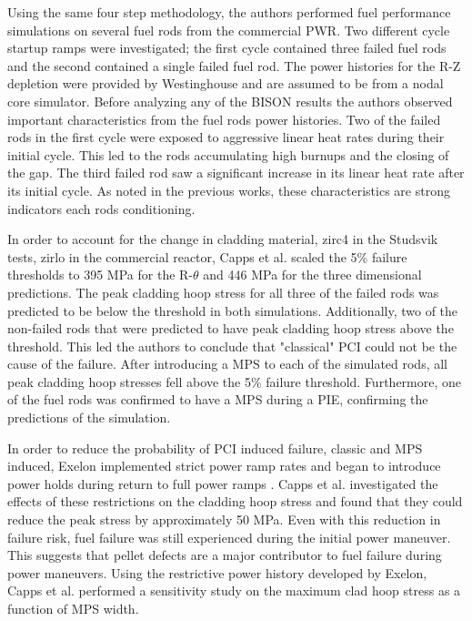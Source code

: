 \documentclass[edeposit,fullpage,11pt]{uiucthesis2009}
\begin{document}
Using the same four step methodology, the authors performed fuel performance simulations on several fuel rods from the commercial \gls{PWR}.
Two different cycle startup ramps were investigated; the first cycle contained three failed fuel rods and the second contained a single failed fuel rod.
The power histories for the R-Z depletion were provided by Westinghouse and are assumed to be from a nodal core simulator.
Before analyzing any of the BISON results the authors observed important characteristics from the fuel rods power histories.
Two of the failed rods in the first cycle were exposed to aggressive linear heat rates during their initial cycle.
This led to the rods accumulating high burnups and the closing of the gap.
The third failed rod saw a significant increase in its linear heat rate after its initial cycle.
As noted in the previous works, these characteristics are strong indicators each rods conditioning.

In order to account for the change in cladding material, zirc4 in the Studsvik tests, zirlo in the commercial reactor, Capps et al. scaled the 5\% failure thresholds to 395 MPa for the R-$\theta$ and 446 MPa for the three dimensional predictions.
The peak cladding hoop stress for all three of the failed rods was predicted to be below the threshold in both simulations.
Additionally, two of the non-failed rods that were predicted to have peak cladding hoop stress above the threshold. 
This led the authors to conclude that "classical" \gls{PCI} could not be the cause of the failure.
After introducing a \gls{MPS} to each of the simulated rods, all peak cladding hoop stresses fell above the 5\% failure threshold.
Furthermore, one of the fuel rods was confirmed to have a \gls{MPS} during a \gls{PIE}, confirming the predictions of the simulation.

In order to reduce the probability of \gls{PCI} induced failure, classic and \gls{MPS} induced, Exelon implemented strict power ramp rates and began to introduce power holds during return to full power ramps \cite{capps_pci_2017}.
Capps et al. investigated the effects of these restrictions on the cladding hoop stress and found that they could reduce the peak stress by approximately 50 MPa.
Even with this reduction in failure risk, fuel failure was still experienced during the initial power maneuver.
This suggests that pellet defects are a major contributor to fuel failure during power maneuvers. 
Using the restrictive power history developed by Exelon, Capps et al. performed a sensitivity study on the maximum clad hoop stress as a function of \gls{MPS} width.
\end{document}
